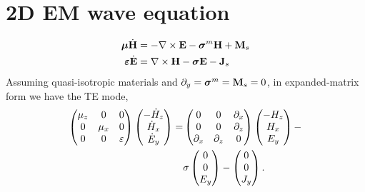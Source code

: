 \documentclass[a4paper,12pt]{article}
\begin{document}
\section*{2D EM wave equation}
\begin{align}
\boldsymbol{\mu}\dot{{\bf H}} &= -\nabla\times{\bf E} -\boldsymbol{\sigma}^m{\bf H} + {\bf M}_s\\
\boldsymbol{\varepsilon}\dot{{\bf E}} &= \nabla\times{\bf H} - \boldsymbol{\sigma}{\bf E} - {\bf J}_s
\end{align}
Assuming quasi-isotropic materials and $\partial_y=\boldsymbol{\sigma}^m={\bf M}_s=0$, in expanded-matrix form we have the TE mode,
\begin{align}
\begin{pmatrix} 
\mu_z & 0 & 0\cr 
0 & \mu_x & 0 \cr
0 & 0 & \varepsilon
\end{pmatrix}
%
\begin{pmatrix} 
-\dot{H}_z \cr
\dot{H}_x \cr
\dot{E}_y
\end{pmatrix}
%
=
%
&
\begin{pmatrix} 
0 & 0 & \partial_x \cr 
0 & 0 & \partial_z \cr
\partial_x & \partial_z & 0
\end{pmatrix}
%
\begin{pmatrix} 
-H_z \cr
H_x \cr
E_y
\end{pmatrix}
%
%
-\\
%
&\sigma
\begin{pmatrix} 
0 \cr
0 \cr
E_y
\end{pmatrix}
%
-
%
\begin{pmatrix} 
0 \cr
0 \cr
J_y
\end{pmatrix}.
\end{align}
\end{document}
